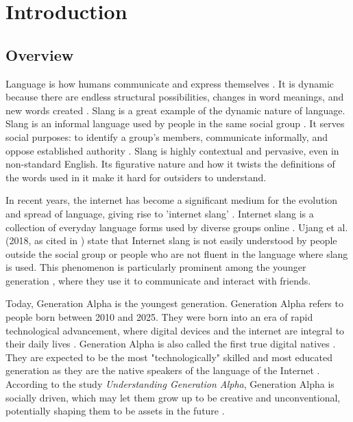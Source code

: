 \chapter{Introduction}
\label{sec:researchdesc}    %

\section{Overview}
\label{sec:overview}

Language is how humans communicate and express themselves \cite{Crystal_Robins_2024}. It is dynamic because there are endless structural possibilities, changes in word meanings, and new words created \cite{Libretexts_2021}. Slang is a great example of the dynamic nature of language. Slang is an informal language used by people in the same social group \cite{Fernández-Toro_2016}. It serves social purposes: to identify a group's members, communicate informally, and oppose established authority \cite{McArthur_1998}. Slang is highly contextual and pervasive, even in non-standard English. Its figurative nature and how it twists the definitions of the words used in it make it hard for outsiders to understand. 

In recent years, the internet has become a significant medium for the evolution and spread of language, giving rise to 'internet slang' \cite{Liu_Zhang_Li_2023}. Internet slang is a collection of everyday language forms used by diverse groups online \cite{Barseghyan2014ONSA}. Ujang et al. (2018, as cited in \cite{Sabri2020}) state that Internet slang is not easily understood by people outside the social group or people who are not fluent in the language where slang is used. This phenomenon is particularly prominent among the younger generation \cite{Maulidiya_Wijaya_Mauren_Adha_Pandin_2021}, where they use it to communicate and interact with friends.

Today, Generation Alpha is the youngest generation. Generation Alpha refers to people born between 2010 and 2025. They were born into an era of rapid technological advancement, where digital devices and the internet are integral to their daily lives \cite{McCrindle2020}. Generation Alpha is also called the first true digital natives \cite{Jukic_Skojo2021}. They are expected to be the most "technologically" skilled and most educated generation as they are the native speakers of the language of the Internet \cite{Prensky_2001b}. According to the study \textit{Understanding Generation Alpha}, Generation Alpha is socially driven, which may let them grow up to be creative and unconventional, potentially shaping them to be assets in the future \cite{Jha2020}.

